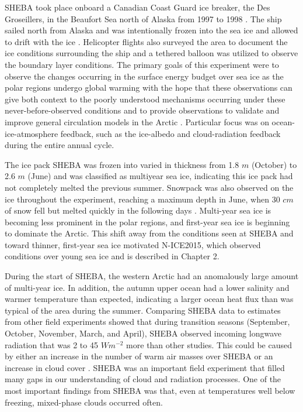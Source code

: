 SHEBA took place onboard a Canadian Coast Guard ice breaker, the Des Groseillers, in the Beaufort Sea north of Alaska from 1997 to 1998 \citep{uttal:2002, shupe:2004}. The ship sailed north from Alaska and was intentionally frozen into the sea ice and allowed to drift with the ice \citep{uttal:2002}. Helicopter flights also surveyed the area to document the ice conditions surrounding the ship and a tethered balloon was utilized to observe the boundary layer conditions. The primary goals of this experiment were to observe the changes occurring in the surface energy budget over sea ice as the polar regions undergo global warming with the hope that these observations can give both context to the poorly understood mechanisms occurring under these never-before-observed conditions and to provide observations to validate and improve general circulation models in the Arctic \citep{uttal:2002}. Particular focus was on ocean-ice-atmosphere feedback, such as the ice-albedo and cloud-radiation feedback during the entire annual cycle. 

The ice pack SHEBA was frozen into varied in thickness from 1.8 $m$ (October) to 2.6 $m$ (June) and was classified as multiyear sea ice, indicating this ice pack had not completely melted the previous summer. Snowpack was also observed on the ice throughout the experiment, reaching a maximum depth in June, when 30 $cm$ of snow fell but melted quickly in the following days \citep{uttal:2002}. Multi-year sea ice is becoming less prominent in the polar regions, and first-year sea ice is beginning to dominate the Arctic. This shift away from the conditions seen at SHEBA and toward thinner, first-year sea ice motivated N-ICE2015, which observed conditions over young sea ice and is described in Chapter 2. 

During the start of SHEBA, the western Arctic had an anomalously large amount of multi-year ice. In addition, the autumn upper ocean had a lower salinity and warmer temperature than expected, indicating a larger ocean heat flux than was typical of the area during the summer. Comparing SHEBA data to estimates from other field experiments showed that during transition seasons (September, October, November, March, and April), SHEBA observed incoming longwave radiation that was 2 to 45 $Wm^{-2}$ more than other studies. This could be caused by either an increase in the number of warm air masses over SHEBA or an increase in cloud cover \citep{persson:2002}. SHEBA was an important field experiment that filled many gaps in our understanding of cloud and radiation processes. One of the most important findings from SHEBA was that, even at temperatures well below freezing, mixed-phase clouds occurred often. 

